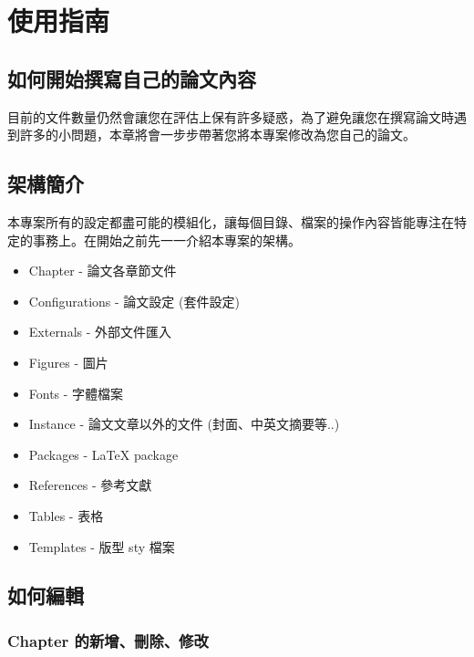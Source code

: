\chapter{使用指南}\label{user_guide}


\section{如何開始撰寫自己的論文內容}
目前的文件數量仍然會讓您在評估上保有許多疑惑，為了避免讓您在撰寫論文時遇到許多的小問題，本章將會一步步帶著您將本專案修改為您自己的論文。

\section{架構簡介}
本專案所有的設定都盡可能的模組化，讓每個目錄、檔案的操作內容皆能專注在特定的事務上。在開始之前先一一介紹本專案的架構。

\begin{itemize}
    \item Chapter - 論文各章節文件
    \item Configurations - 論文設定 (套件設定)
    \item Externals - 外部文件匯入
    \item Figures - 圖片
    \item Fonts - 字體檔案
    \item Instance - 論文文章以外的文件 (封面、中英文摘要等..)
    \item Packages - LaTeX package
    \item References - 參考文獻
    \item Tables - 表格
    \item Templates - 版型 sty 檔案
\end{itemize}

\section{如何編輯}

\subsection*{Chapter 的新增、刪除、修改}

